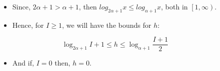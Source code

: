 \documentclass{beamer}
\begin{document}
\begin{frame}
    \begin{columns}
        \begin{column}{\textlecolumn}
            \begin{block}{}
                \begin{itemize}
                    \item Since, \(2\alpha + 1 > \alpha + 1\), then \(log_{2\alpha + 1} x \leq log_{\alpha + 1}x\), both in \(\left[1, \infty\right)\).
                    \item Hence, for \(I \geq 1\), we will have the bounds for \(h\):
                \end{itemize}
                \[
                    \log_{2\alpha + 1} I + 1 
                    \leq
                    h
                    \leq
                    \log_{\alpha + 1} \frac{I + 1}{2}
                \]
                \begin{itemize}
                    \item And if, \(I = 0\) then, \(h = 0\).
                \end{itemize}
            \end{block}
        \end{column}
        \begin{column}{\textricolumn}
        \end{column}
    \end{columns}
\end{frame}
\end{document}
